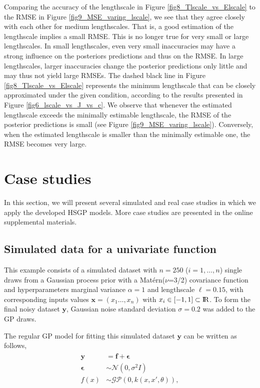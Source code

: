 \documentclass[onecolumn,a4paper,11pt]{article}
\begin{document}
Comparing the accuracy of the lengthscale in Figure 
\ref{fig8_Tlscale_vs_Elscale} to the RMSE in Figure \ref{fig9_MSE_varing_lscale},
we see that they agree closely with each other for medium lengthscales.
That is, a good estimation of the lengthscale implies a
small RMSE. This is no longer true for very small or large lengthscales.
In small lengthscales, even very small inaccuracies 
may have a strong influence on the posteriors predictions and thus on the RMSE.
In large lengthscales, larger inaccuracies change the posterior predictions
only little and may thus not yield large RMSEs.
The dashed black line in Figure \ref{fig8_Tlscale_vs_Elscale} represents the 
minimum lengthscale that can be closely approximated under the given condition, according to the results presented in Figure \ref{fig6_lscale_vs_J_vs_c}. 
We observe that whenever the estimated lengthscale exceeds the minimally
estimable lengthscale, the RMSE of the posterior predictions is small
(see Figure \ref{fig9_MSE_varing_lscale}).
Conversely, when the estimated lengthscale is smaller than the minimally
estimable one, the RMSE becomes very large.


\section{Case studies}\label{ch5_sec_cases}

In this section, we will present several simulated and real case studies in which we apply the developed HSGP models. More case studies are presented in the online supplemental materials.

\subsection{Simulated data for a univariate function}\label{ch5_sec_univariate_simu}

This example consists of a simulated dataset with $n=250$ ($i=1,\dots,n$) single draws from a Gaussian process prior with a Mat{\'e}rn($\nu$=3/2) covariance function and hyperparameters marginal variance $\alpha=1$ and lengthscale $\ell=0.15$, with corresponding inputs values $\bm{x}=(x_1\dots,x_n)$ with $x_i \in [-1,1] \subset {\rm I\!R}$. To form the final noisy dataset $\bm{y}$, Gaussian noise standard deviation $\sigma=0.2$ was added to the GP draws.

The regular GP model for fitting this simulated dataset $\bm{y}$ can be written as follows,
%
\begin{align*}\label{ch5_eq_latentgp_simudata1}
\begin{split}
\bm{y} &= \bm{f} + \bm{\epsilon} \\
\bm{\epsilon} &\sim \mathcal{N}(0, \sigma^2  I) \\
f(x) &\sim \mathcal{GP}(0, k(x, x', \theta)),
\end{split}
\end{align*}
\end{document}
